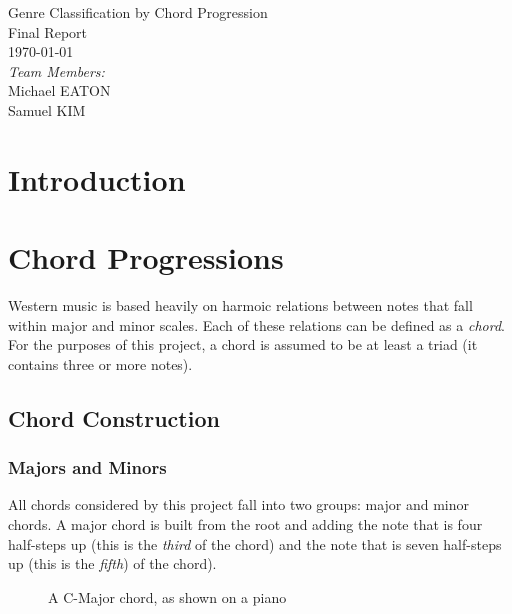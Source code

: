 \documentclass{article}
\begin{document}
\fancyhf{}
\rhead{\today}

\begin{titlepage}
\begin{center}
{\huge Genre Classification by Chord Progression}\\[2cm]
{\Large Final Report}\\[2cm]
{\large \today}\\[2cm]
\emph{Team Members:}\\
Michael \uppercase{Eaton}\\
Samuel \uppercase{Kim}\\
\end{center}
\end{titlepage}

\tableofcontents
\newpage

\section{Introduction}

\newpage

\section{Chord Progressions}
Western music is based heavily on harmoic relations between notes 
that fall within major and minor scales. Each of these relations can be 
defined as a \emph{chord}.  For the purposes of this project, a chord 
is assumed to be at least a triad (it contains three or more notes).

	\subsection{Chord Construction}
	
		\subsubsection{Majors and Minors}
		All chords considered by this project fall into two groups:  major 
		and minor chords.  A major chord is built from the root and adding 
		the note that is four half-steps up (this is the \emph{third} of the 
		chord) and the note that is seven half-steps up (this is the \emph{fifth}) 
		of the chord).

		\begin{figure}[htb]
		\caption{A  C-Major chord, as shown on a piano}
		\end{figure} 
\end{document}
